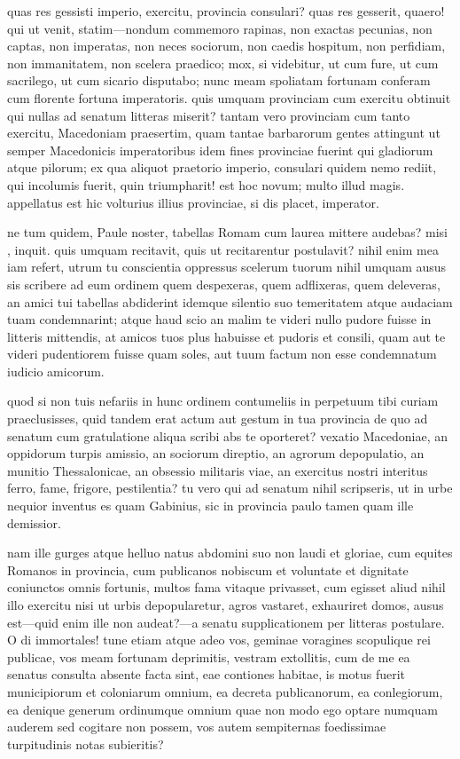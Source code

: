  quas res gessisti imperio, exercitu, provincia consulari? quas res gesserit, quaero! qui ut venit, statim—nondum commemoro rapinas, non exactas pecunias, non captas, non imperatas, non neces sociorum, non caedis hospitum, non perfidiam, non immanitatem, non scelera praedico; mox, si videbitur, ut cum fure, ut cum sacrilego, ut cum sicario disputabo; nunc meam spoliatam fortunam conferam cum florente fortuna imperatoris. quis umquam provinciam cum exercitu obtinuit qui nullas ad senatum litteras miserit? tantam vero provinciam cum tanto exercitu, Macedoniam praesertim, quam tantae barbarorum gentes attingunt ut semper Macedonicis imperatoribus idem fines provinciae fuerint qui gladiorum atque pilorum; ex qua aliquot praetorio imperio, consulari quidem nemo rediit, qui incolumis fuerit, quin triumpharit! est hoc novum; multo illud magis. appellatus est hic volturius illius provinciae, si dis placet, imperator.

 ne tum quidem, Paule noster, tabellas Romam cum laurea mittere audebas? misi , inquit. quis umquam recitavit, quis ut recitarentur postulavit? nihil enim mea iam refert, utrum tu conscientia oppressus scelerum tuorum nihil umquam ausus sis scribere ad eum ordinem quem despexeras, quem adflixeras, quem deleveras, an amici tui tabellas abdiderint idemque silentio suo temeritatem atque audaciam tuam condemnarint; atque haud scio an malim te videri nullo pudore fuisse in litteris mittendis, at amicos tuos plus habuisse et pudoris et consili, quam aut te videri pudentiorem fuisse quam soles, aut tuum factum non esse condemnatum iudicio amicorum.

 quod si non tuis nefariis in hunc ordinem contumeliis in perpetuum tibi curiam praeclusisses, quid tandem erat actum aut gestum in tua provincia de quo ad senatum cum gratulatione aliqua scribi abs te oporteret? vexatio Macedoniae, an oppidorum turpis amissio, an sociorum direptio, an agrorum depopulatio, an munitio Thessalonicae, an obsessio militaris viae, an exercitus nostri interitus ferro, fame, frigore, pestilentia? tu vero qui ad senatum nihil scripseris, ut in urbe nequior inventus es quam Gabinius, sic in provincia paulo tamen quam ille demissior.

 nam ille gurges atque helluo natus abdomini suo non laudi et gloriae, cum equites Romanos in provincia, cum publicanos nobiscum et voluntate et dignitate coniunctos omnis fortunis, multos fama vitaque privasset, cum egisset aliud nihil illo exercitu nisi ut urbis depopularetur, agros vastaret, exhauriret domos, ausus est—quid enim ille non audeat?—a senatu supplicationem per litteras postulare. O di immortales! tune etiam atque adeo vos, geminae voragines scopulique rei publicae, vos meam fortunam deprimitis, vestram extollitis, cum de me ea senatus consulta absente facta sint, eae contiones habitae, is motus fuerit municipiorum et coloniarum omnium, ea decreta publicanorum, ea conlegiorum, ea denique generum ordinumque omnium quae non modo ego optare numquam auderem sed cogitare non possem, vos autem sempiternas foedissimae turpitudinis notas subieritis?

